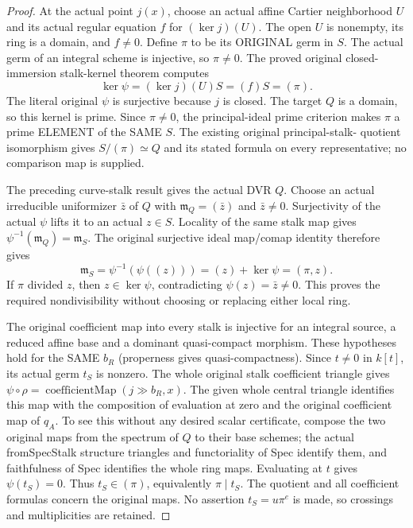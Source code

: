 \begin{proof}
At the actual point $j(x)$, choose an actual affine Cartier
neighborhood $U$ and its actual regular equation $f$ for
$(\ker j)(U)$. The open $U$ is nonempty, its ring is a domain, and
$f\ne0$. Define $\pi$ to be its ORIGINAL germ in $S$.
The actual germ of an integral scheme is injective, so $\pi\ne0$.
The proved original closed-immersion stalk-kernel theorem computes
\[
 \ker\psi=(\ker j)(U)S=(f)S=(\pi).
\]
The literal original $\psi$ is surjective because $j$ is closed.
The target $Q$ is a domain, so this kernel is prime. Since
$\pi\ne0$, the principal-ideal prime criterion makes $\pi$ a prime
ELEMENT of the SAME $S$. The existing original principal-stalk-
quotient isomorphism gives $S/(\pi)\simeq Q$ and its stated formula
on every representative; no comparison map is supplied.

The preceding curve-stalk result gives the actual DVR $Q$. Choose
an actual irreducible uniformizer $\bar z$ of $Q$ with
$\mathfrak m_Q=(\bar z)$ and $\bar z\ne0$. Surjectivity of the
actual $\psi$ lifts it to an actual $z\in S$. Locality of the same
stalk map gives $\psi^{-1}(\mathfrak m_Q)=\mathfrak m_S$.
The original surjective ideal map/comap identity therefore gives
\[
 \mathfrak m_S=\psi^{-1}(\psi((z)))=(z)+\ker\psi=(\pi,z).
\]
If $\pi$ divided $z$, then $z\in\ker\psi$, contradicting
$\psi(z)=\bar z\ne0$. This proves the required nondivisibility
without choosing or replacing either local ring.

The original coefficient map into every stalk is injective for
an integral source, a reduced affine base and a dominant
quasi-compact morphism. These hypotheses hold for the SAME $b_R$
(properness gives quasi-compactness). Since $t\ne0$ in $k[t]$,
its actual germ $t_S$ is nonzero. The whole original stalk
coefficient triangle gives
$\psi\circ\rho=\operatorname{coefficientMap}(j\gg b_R,x)$.
The given whole central triangle identifies this map with the
composition of evaluation at zero and the original coefficient
map of $q_A$. To see this without any desired scalar certificate,
compose the two original maps from the spectrum of $Q$ to their
base schemes; the actual fromSpecStalk structure triangles and
functoriality of Spec identify them, and faithfulness of Spec
identifies the whole ring maps. Evaluating at $t$ gives
$\psi(t_S)=0$. Thus $t_S\in(\pi)$, equivalently $\pi\mid t_S$.
The quotient and all coefficient formulas concern the original
maps. No assertion $t_S=u\pi^e$ is made, so crossings and
multiplicities are retained.
\end{proof}

